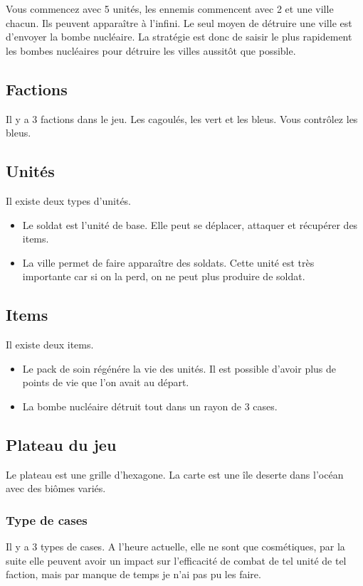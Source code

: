 \documentclass{article}
\begin{document}
Vous commencez avec 5 unités, les ennemis commencent avec 2 et une ville chacun. Ils peuvent apparaître à l'infini. 
Le seul moyen de détruire une ville est d'envoyer la bombe nucléaire. La stratégie est donc de saisir le plus rapidement les bombes nucléaires pour
détruire les villes aussitôt que possible.

\subsection{Factions}
Il y a 3 factions dans le jeu. Les cagoulés, les vert et les bleus. Vous contrôlez les bleus.

\subsection{Unités}
Il existe deux types d'unités.

\begin{itemize}
    \item Le soldat est l'unité de base. Elle peut se déplacer, attaquer et récupérer des items.
    \item La ville permet de faire apparaître des soldats. Cette unité est très importante car si on la perd, on ne peut plus produire de soldat.
\end{itemize}

\subsection{Items}
Il existe deux items.

\begin{itemize}
    \item Le pack de soin régénére la vie des unités. Il est possible d'avoir plus de points de vie que l'on avait au départ.
    \item La bombe nucléaire détruit tout dans un rayon de 3 cases.
\end{itemize}

\subsection{Plateau du jeu}
Le plateau est une grille d'hexagone. La carte est une île deserte dans l'océan avec des biômes variés.

\subsubsection{Type de cases}
Il y a 3 types de cases. A l'heure actuelle, elle ne sont que cosmétiques, par la suite elle peuvent avoir un impact sur l'efficacité de combat de tel unité de
tel faction, mais par manque de temps je n'ai pas pu les faire.
\end{document}
